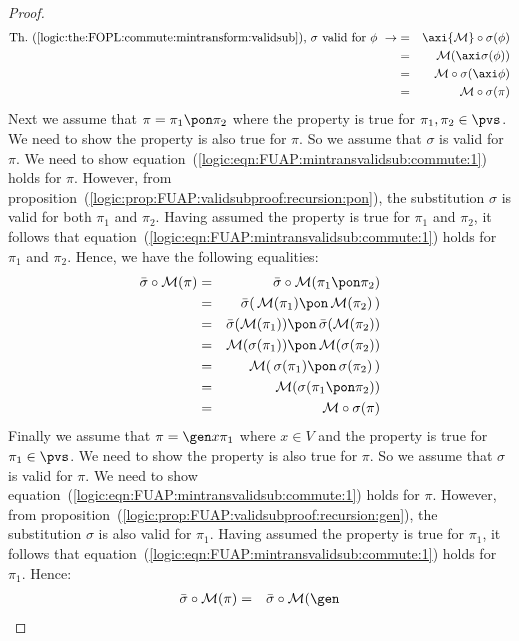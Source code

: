 \begin{proof}
\begin{eqnarray*}
    \mbox{Th.~(\ref{logic:the:FOPL:commute:mintransform:validsub}), $\sigma$ valid for $\phi$}\ \rightarrow
    &=&\axi{\cal M}\circ\sigma(\phi)\\
    &=&{\cal M}(\axi\sigma(\phi))\\
    &=&{\cal M}\circ\sigma(\axi\phi)\\
    &=&{\cal M}\circ\sigma(\pi)\\
    \end{eqnarray*}
Next we assume that $\pi=\pi_{1}\pon\pi_{2}$ where the property is
true for $\pi_{1},\pi_{2}\in\pvs$. We need to show the property is
also true for $\pi$. So we assume that $\sigma$ is valid for $\pi$.
We need to show
equation~(\ref{logic:eqn:FUAP:mintransvalidsub:commute:1}) holds for
$\pi$. However, from
proposition~(\ref{logic:prop:FUAP:validsubproof:recursion:pon}), the
substitution $\sigma$ is valid for both $\pi_{1}$ and $\pi_{2}$.
Having assumed the property is true for $\pi_{1}$ and $\pi_{2}$, it
follows that
equation~(\ref{logic:eqn:FUAP:mintransvalidsub:commute:1}) holds for
$\pi_{1}$ and $\pi_{2}$. Hence, we have the following equalities:
    \begin{eqnarray*}
    \bar{\sigma}\circ{\cal M}(\pi)
    &=&\bar{\sigma}\circ{\cal M}(\pi_{1}\pon\pi_{2})\\
    &=&\bar{\sigma}(\,{\cal M}(\pi_{1})\pon\,{\cal M}(\pi_{2})\,)\\
    &=&\bar{\sigma}({\cal M}(\pi_{1}))\pon\,\bar{\sigma}({\cal
    M}(\pi_{2}))\\
    &=&{\cal M}(\sigma(\pi_{1}))\pon\,{\cal
    M}(\sigma(\pi_{2}))\\
    &=&{\cal M}(\,\sigma(\pi_{1})\pon\,\sigma(\pi_{2})\,)\\
    &=&{\cal M}(\sigma(\pi_{1}\pon\pi_{2}))\\
    &=&{\cal M}\circ\sigma(\pi)
    \end{eqnarray*}
Finally we assume that $\pi=\gen x\pi_{1}$ where $x\in V$ and the
property is true for $\pi_{1}\in\pvs$. We need to show the property
is also true for $\pi$. So we assume that $\sigma$ is valid for
$\pi$. We need to show
equation~(\ref{logic:eqn:FUAP:mintransvalidsub:commute:1}) holds for
$\pi$. However, from
proposition~(\ref{logic:prop:FUAP:validsubproof:recursion:gen}), the
substitution $\sigma$ is also valid for $\pi_{1}$. Having assumed
the property is true for $\pi_{1}$, it follows that
equation~(\ref{logic:eqn:FUAP:mintransvalidsub:commute:1}) holds for
$\pi_{1}$. Hence:
    \begin{eqnarray*}
    \bar{\sigma}\circ{\cal M}(\pi)&=&\bar{\sigma}\circ{\cal M}(\gen

\end{eqnarray*}
\end{proof}
